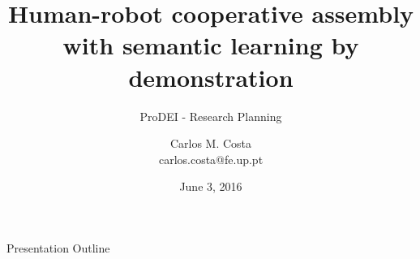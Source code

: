 





\title{Human-robot cooperative assembly with semantic learning by demonstration}
\subtitle{ProDEI - Research Planning}
\author{Carlos M. Costa\texorpdfstring{\\{\ttfamily carlos.costa@fe.up.pt}}{}}
\date{June 3, 2016}




\begin{frame}
	\titlepage
\end{frame}




\begin{frame}{Presentation Outline}
	\begingroup
	\footnotesize
	\tableofcontents
	\endgroup
\end{frame}














